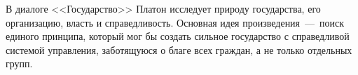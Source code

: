 
В диалоге <<Государство>> Платон исследует природу государства, его организацию, власть и справедливость. Основная идея произведения~---~поиск единого принципа, который мог бы создать сильное государство с справедливой системой управления, заботящуюся о благе всех граждан, а не только отдельных групп.


